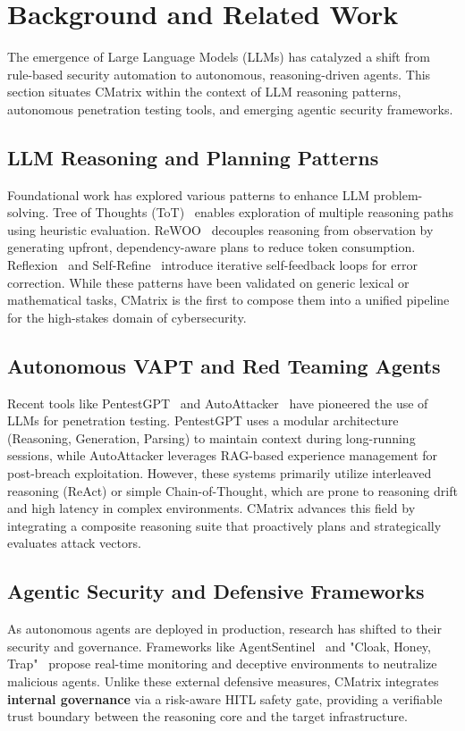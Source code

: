 \section{Background and Related Work}

The emergence of Large Language Models (LLMs) has catalyzed a shift from rule-based security automation to autonomous, reasoning-driven agents. This section situates CMatrix within the context of LLM reasoning patterns, autonomous penetration testing tools, and emerging agentic security frameworks.

\subsection{LLM Reasoning and Planning Patterns}
Foundational work has explored various patterns to enhance LLM problem-solving. Tree of Thoughts (ToT)~\cite{tot} enables exploration of multiple reasoning paths using heuristic evaluation. ReWOO~\cite{rewoo} decouples reasoning from observation by generating upfront, dependency-aware plans to reduce token consumption. Reflexion~\cite{reflexion} and Self-Refine~\cite{selfrefine} introduce iterative self-feedback loops for error correction. While these patterns have been validated on generic lexical or mathematical tasks, CMatrix is the first to compose them into a unified pipeline for the high-stakes domain of cybersecurity.

\subsection{Autonomous VAPT and Red Teaming Agents}
Recent tools like PentestGPT~\cite{pentestgpt} and AutoAttacker~\cite{autoattacker} have pioneered the use of LLMs for penetration testing. PentestGPT uses a modular architecture (Reasoning, Generation, Parsing) to maintain context during long-running sessions, while AutoAttacker leverages RAG-based experience management for post-breach exploitation. However, these systems primarily utilize interleaved reasoning (ReAct) or simple Chain-of-Thought, which are prone to reasoning drift and high latency in complex environments. CMatrix advances this field by integrating a composite reasoning suite that proactively plans and strategically evaluates attack vectors.

\subsection{Agentic Security and Defensive Frameworks}
As autonomous agents are deployed in production, research has shifted to their security and governance. Frameworks like AgentSentinel~\cite{agentsentinel} and "Cloak, Honey, Trap"~\cite{cloak} propose real-time monitoring and deceptive environments to neutralize malicious agents. Unlike these external defensive measures, CMatrix integrates \textbf{internal governance} via a risk-aware HITL safety gate, providing a verifiable trust boundary between the reasoning core and the target infrastructure.


